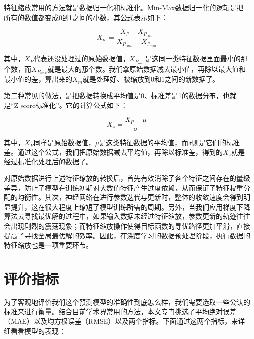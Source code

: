特征缩放常用的方法就是数据归一化和标准化。Min-Max数据归一化的逻辑是把所有的数值都变成0到1之间的小数，其公式表示如下：

\begin{equation}
    X_m = \frac{X_P-X_{P_{min}}}{X_{P_{max}}-X_{P_{min}}}
\end{equation}

其中，$X_P$代表还没处理过的原始数据值，$X_{P_{min}}$是这同一类特征数据里面最小的那个数，而$X_{P_{max}}$就是最大的那个数。我们拿原始数据减去最小值，再除以最大值和最小值的差，算出来的$X_m$就是处理好、被缩放到0和1之间的新数据了。

第二种常见的做法，是把数据转换成平均值是0、标准差是1的数据分布，也就是“Z-score标准化”。它的计算公式如下：

\begin{equation}
    X_z = \frac{X_P-\mu}{\sigma}
\end{equation}

其中，$X_P$同样是原始数据值，$\mu$是这类特征数据的平均值，而$\sigma$则是它们的标准差。通过这个公式，我们把原始数据减去平均值，再除以标准差，得到的$X_z$就是经过标准化处理后的数据了。

对原始数据进行上述特征缩放的转换后，首先有效消除了各个特征之间存在的量级差异，防止了模型在训练初期对大数值特征产生过度依赖，从而保证了特征权重分配的均衡性。其次，神经网络在进行参数迭代与更新时，整体的收敛速度会得到明显提升，这在很大程度上缩短了模型训练所需的周期。另外，当我们应用梯度下降算法去寻找最优解的过程中，如果输入数据未经过特征缩放，参数更新的轨迹往往会出现剧烈的震荡现象；而特征缩放操作使得目标函数的寻优路径更加平滑，直接提高了寻找全局最优解的效率。因此，在深度学习的数据预处理阶段，执行数据的特征缩放也是一项重要环节。

\section{评价指标}

为了客观地评价我们这个预测模型的准确性到底怎么样，我们需要选取一些公认的标准来进行衡量。结合目前学术界常用的方法，本文专门挑选了平均绝对误差（MAE）以及均方根误差（RMSE）以及两个指标。下面通过这两个指标，来详细看看模型的表现：

